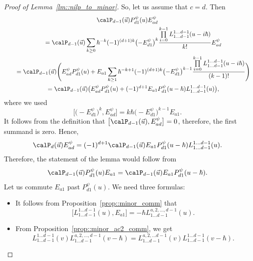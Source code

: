 \begin{proof}[Proof of Lemma~\ref{lm::nilp_to_minor}]
		So, let us assume that $c=d$. Then
		\begin{gather*}
			\calP_{d-1}(\vec{u}) P^{\psi}_{d1}(u) E_{ad}^{\psi} \\
		\qquad	= \calP_{d-1}(\vec{u})\sum\limits_{k\geq 0} \hbar^{-k} (-1)^{(d+1)k} \bigl(-E_{d1}^{\psi}\bigr)^k \frac{\prod\limits_{i=0}^{k-1} L_{1\dots d-1}^{1\dots d-1}(u-i\hbar )}{k!} E_{ad}^{\psi} \\
			\qquad= \calP_{d-1}(\vec{u}) \Biggl( E_{ad}^{\psi} P^{\psi}_{d1}(u) + E_{a1} \sum\limits_{k\geq 1} \hbar^{-k+1} (-1)^{(d+1)k} \bigl(-E_{d1}^{\psi}\bigr)^{k-1} \frac{\prod\limits_{i=0}^{k-1} L_{1\dots d-1}^{1\dots d-1}(u-i\hbar)}{(k-1)!} \Biggr) \\
		\qquad	=  \calP_{d-1}(\vec{u}) \bigl( E_{ad}^{\psi} P^{\psi}_{d1}(u) + (-1)^{d+1} E_{a1} P^{\psi}_{d1}(u-\hbar) L_{1\dots d-1}^{1\dots d-1}(u) \bigr),
		\end{gather*}
		where we used
		\[
		\bigl[\bigl(-E_{d1}^{\psi}\bigr)^k, E_{ad}^{\psi}\bigr] = k \hbar \bigl(-E_{d1}^{\psi}\bigr)^{k-1} E_{a1}.
		\]
		It follows from the definition that $\bigl[\calP_{d-1}(\vec{u}),E_{ad}^{\psi}\bigr]=0$, therefore, the first summand is zero. Hence,
		\[
		\calP_{d}(\vec{u}) E_{ad}^{\psi} = (-1)^{d+1} \calP_{d-1}(\vec{u})E_{a1} P^{\psi}_{d1}(u-\hbar) L_{1\dots d-1}^{1\dots d-1}(u).
		\]
		Therefore, the statement of the lemma would follow from
		\begin{equation}
			\label{eq::lm_nilp_to_minor_shift}
			\calP_{d-1}(\vec{u}) P_{d1}^{\psi}(u) E_{a1} = \calP_{d-1}(\vec{u}) E_{a1} P_{d1}^{\psi}(u-\hbar).
		\end{equation}
		Let us commute $E_{a1}$ past $P_{d1}^{\psi}(u)$. We need three formulas:
		\begin{itemize}\itemsep=0pt
			\item It follows from Proposition~\ref{prop::minor_comm} that
			\begin{equation*}
				\bigl[L_{1\dots d-1}^{1\dots d-1}(u), E_{a1}\bigr] = - \hbar L_{1 \dots d-1}^{a,2,\dots,d-1}(u).
			\end{equation*}
			
			\item From Proposition~\ref{prop::minor_ac2_comm}, we get
			\[
			L_{1\dots d-1}^{1\dots d-1}(v) L_{1\dots d-1}^{a,2,\dots,d-1}(v-\hbar) = L_{1 \dots d-1}^{a,2,\dots d-1}(v) L_{1\dots d-1}^{1\dots d-1}(v-\hbar).
			\]
			

\end{itemize}
\end{proof}
